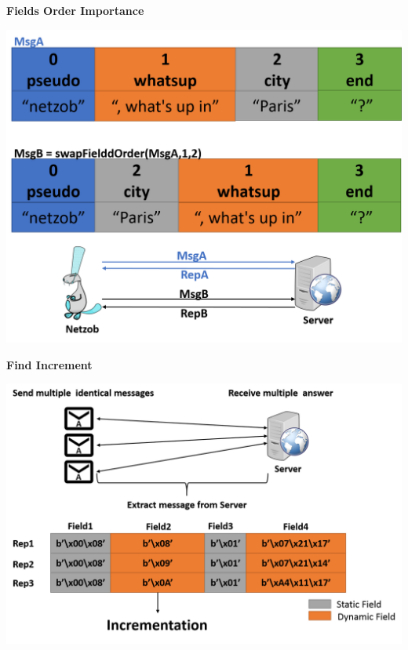 \documentclass{beamer}
\newcounter{m} %
\newcounter{c} %
\begin{document}
\begin{frame}{\bf Fields Order Importance}
\begin{center}
\includegraphics[scale=0.25]{swapFieldOrder.png}
\end{center}
\end{frame}

\begin{frame}{\bf Find Increment}
\begin{center}
\includegraphics[scale=0.3]{incrementation.png}
\end{center}
\end{frame}
\end{document}

